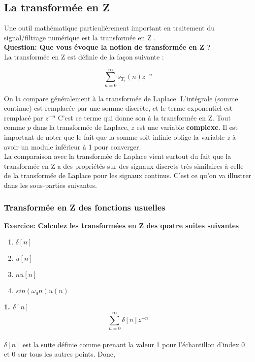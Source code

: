 \documentclass[11pt,a4paper]{article}
\begin{document}
\subsection{La transformée en Z}
Une outil mathématique particulièrement important en traitement du signal/filtrage numérique est la transformée en Z .\\

\textbf{Question: Que vous évoque la notion de transformée en Z ?}\\

La transformée en Z est définie de la façon suivante :

\[\sum_{n = 0}^{\infty} s_{T_e}(n) z^{-n}\] 

On la compare généralement à la transformée de Laplace. L'intégrale (somme continue) est remplacée par une somme discrète, et le terme exponentiel est remplacé par $z^{-n}$ C'est ce terme qui donne son à la transformée en Z. Tout comme $p$ dans la transformée de Laplace, $z$  est une variable \textbf{complexe}. Il est important de noter que le fait que la somme soit infinie oblige la variable $z$ à avoir un module inférieur à 1 pour converger.\\

La comparaison avec la transformée de Laplace vient surtout du fait que la transformée en Z a des propriétés sur des signaux discrets très similaires à celle de la transformée de Laplace pour les signaux continus. C'est ce qu'on va illustrer dans les sous-parties suivantes.\\

\subsubsection{Transformée en Z des fonctions usuelles}

\textbf{Exercice: Calculez les transformées en Z des quatre suites suivantes}
\begin{enumerate}
\item $\delta[n]$
\item $u[n]$
\item $nu[n]$
\item $sin(\omega_0 n)u(n)$
\end{enumerate} 

\textbf{1. $\delta[n]$}
\[\sum_{n = 0}^{\infty} \delta[n] z^{-n}\] \\

$\delta[n]$ est la suite définie comme prenant la valeur 1 pour l'échantillon d'index 0 et 0 sur tous les autres points. Donc,\\
\end{document}
